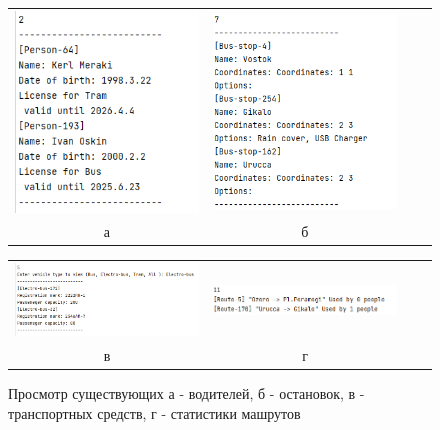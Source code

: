 \begin{figure}[b!!]
    \centering
    \begin{tabular}{cccc}
         \includegraphics[width=7.5cm]{images/ViewDrivers.png} & 
         \includegraphics[width=7.5cm]{images/ViewStops.png}  \\
         а & б \\[1em]
    \end{tabular}
        \begin{tabular}{cccc}
         \includegraphics[width=7.5cm]{images/ViewVehicles.png} &
         \includegraphics[width=7.5cm]{images/ViewStats.png} \\
         в & г\\[1em]
    \end{tabular}
    \caption{Просмотр существующих а - водителей, б - остановок, в - транспортных средств, г - статистики машрутов}
\end{figure}


